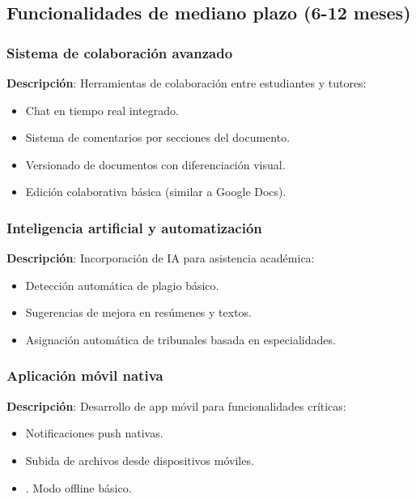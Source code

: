 \documentclass[12pt,a4paper,oneside]{report}
\providecommand{\tightlist}{%
  \setlength{\itemsep}{0pt}\setlength{\parskip}{0pt}}
\begin{document}
\subsection{Funcionalidades de mediano plazo (6-12
meses)}\label{funcionalidades-de-mediano-plazo-6-12-meses}

\subsubsection{Sistema de colaboración
avanzado}\label{sistema-de-colaboraciuxf3n-avanzado}

\textbf{Descripción}: Herramientas de colaboración entre estudiantes y
tutores:

\begin{itemize}
\tightlist
\item
  Chat en tiempo real integrado.
\item
  Sistema de comentarios por secciones del documento.
\item
  Versionado de documentos con diferenciación visual.
\item
  Edición colaborativa básica (similar a Google Docs).
\end{itemize}

\subsubsection{Inteligencia artificial y
automatización}\label{inteligencia-artificial-y-automatizaciuxf3n}

\textbf{Descripción}: Incorporación de IA para asistencia académica: 

\begin{itemize}
\tightlist
\item
  Detección automática de plagio básico.
\item
  Sugerencias de mejora en resúmenes y textos.
\item
  Asignación automática de tribunales basada en especialidades.
\end{itemize}

\subsubsection{Aplicación móvil
nativa}\label{aplicaciuxf3n-muxf3vil-nativa}

\textbf{Descripción}: Desarrollo de app móvil para funcionalidades
críticas: 

\begin{itemize}
\tightlist
\item
  Notificaciones push nativas.
\item
  Subida de archivos desde dispositivos móviles.
\item.
  Modo offline básico.
\end{itemize}
\end{document}
